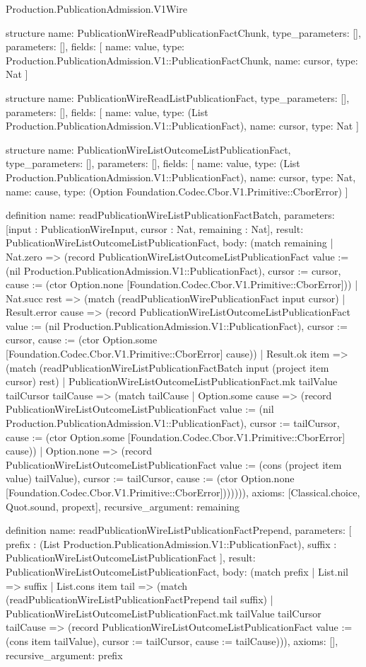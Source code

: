 \begin{lexlean}{Production.PublicationAdmission.V1Wire}
\begin{semanticmodule}
structure{
  name: PublicationWireReadPublicationFactChunk,
  type_parameters: [],
  parameters: [],
  fields: [
    {name: value, type: Production.PublicationAdmission.V1::PublicationFactChunk},
    {name: cursor, type: Nat}
  ]
}

structure{
  name: PublicationWireReadListPublicationFact,
  type_parameters: [],
  parameters: [],
  fields: [
    {name: value, type: (List Production.PublicationAdmission.V1::PublicationFact)},
    {name: cursor, type: Nat}
  ]
}

structure{
  name: PublicationWireListOutcomeListPublicationFact,
  type_parameters: [],
  parameters: [],
  fields: [
    {name: value, type: (List Production.PublicationAdmission.V1::PublicationFact)},
    {name: cursor, type: Nat},
    {name: cause, type: (Option Foundation.Codec.Cbor.V1.Primitive::CborError)}
  ]
}

definition{
  name: readPublicationWireListPublicationFactBatch,
  parameters: [input : PublicationWireInput, cursor : Nat, remaining : Nat],
  result: PublicationWireListOutcomeListPublicationFact,
  body: (match remaining
    | Nat.zero => (record PublicationWireListOutcomeListPublicationFact {value := (nil Production.PublicationAdmission.V1::PublicationFact), cursor := cursor, cause := (ctor Option.none [Foundation.Codec.Cbor.V1.Primitive::CborError])})
    | Nat.succ rest => (match (readPublicationWirePublicationFact input cursor)
      | Result.error cause => (record PublicationWireListOutcomeListPublicationFact {value := (nil Production.PublicationAdmission.V1::PublicationFact), cursor := cursor, cause := (ctor Option.some [Foundation.Codec.Cbor.V1.Primitive::CborError] cause)})
      | Result.ok item => (match (readPublicationWireListPublicationFactBatch input (project item cursor) rest)
        | PublicationWireListOutcomeListPublicationFact.mk tailValue tailCursor tailCause => (match tailCause
          | Option.some cause => (record PublicationWireListOutcomeListPublicationFact {value := (nil Production.PublicationAdmission.V1::PublicationFact), cursor := tailCursor, cause := (ctor Option.some [Foundation.Codec.Cbor.V1.Primitive::CborError] cause)})
          | Option.none => (record PublicationWireListOutcomeListPublicationFact {value := (cons (project item value) tailValue), cursor := tailCursor, cause := (ctor Option.none [Foundation.Codec.Cbor.V1.Primitive::CborError])}))))),
  axioms: [Classical.choice, Quot.sound, propext],
  recursive_argument: remaining
}

definition{
  name: readPublicationWireListPublicationFactPrepend,
  parameters: [
    prefix : (List Production.PublicationAdmission.V1::PublicationFact),
    suffix : PublicationWireListOutcomeListPublicationFact
  ],
  result: PublicationWireListOutcomeListPublicationFact,
  body: (match prefix
    | List.nil => suffix
    | List.cons item tail => (match (readPublicationWireListPublicationFactPrepend tail suffix)
      | PublicationWireListOutcomeListPublicationFact.mk tailValue tailCursor tailCause => (record PublicationWireListOutcomeListPublicationFact {value := (cons item tailValue), cursor := tailCursor, cause := tailCause}))),
  axioms: [],
  recursive_argument: prefix
}


\end{semanticmodule}
\end{lexlean}
